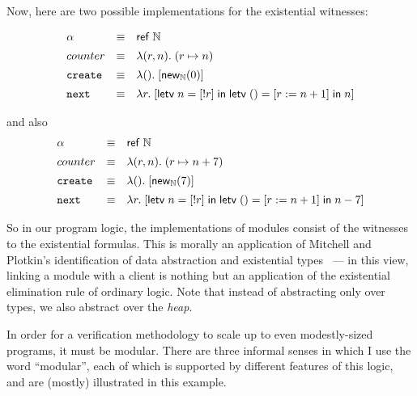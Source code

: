 Now, here are two possible implementations for the existential witnesses:

\begin{displaymath}
\begin{array}{lcl}
\alpha & \equiv & \mathsf{ref}\;\mathbb{N} \\[0.5em]
counter & \equiv & \lambda (r, n).\; (r \mapsto n) \\[0.5em]
\mathtt{create} & \equiv & \lambda ().\; [\mathsf{new}_{\mathbb{N}}(0)] \\[0.5em]
\mathtt{next}  & \equiv & \lambda r.\; [\mathsf{letv}\;n = [!r]\;\mathsf{in}\;
                                        \mathsf{letv}\;() = [r := n + 1]\;\mathsf{in}\;n] \\
\end{array}
\end{displaymath}

and also                                        
\begin{displaymath}
\begin{array}{lcl}
\alpha & \equiv & \mathsf{ref}\;\mathbb{N} \\[0.5em]
counter & \equiv & \lambda (r, n).\; (r \mapsto n + 7) \\[0.5em]
\mathtt{create} & \equiv & \lambda ().\; [\mathsf{new}_{\mathbb{N}}(7)] \\[0.5em]
\mathtt{next}  & \equiv & \lambda r.\; [\mathsf{letv}\;n = [!r]\;\mathsf{in}\;
                                        \mathsf{letv}\;() = [r := n + 1]\;\mathsf{in}\;n - 7] \\
\end{array}
\end{displaymath}

So in our program logic, the implementations of modules consist of the
witnesses to the existential formulas. This is morally an application
of Mitchell and Plotkin's identification of data abstraction and
existential types~\cite{mitchell-plotkin} --- in this view, linking a
module with a client is nothing but an application of the existential
elimination rule of ordinary logic.  Note that instead of abstracting
only over types, we also abstract over the \emph{heap}.

In order for a verification methodology to scale up to even
modestly-sized programs, it must be modular. There are three informal
senses in which I use the word ``modular'', each of which is supported
by different features of this logic, and are (mostly) illustrated in
this example.

